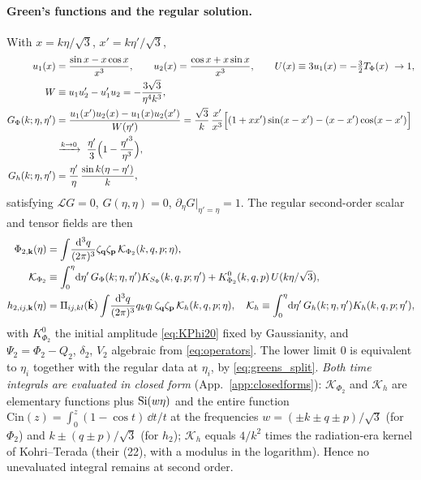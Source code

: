 \paragraph{Green's functions and the regular solution.}
With $x=k\eta/\sqrt3$, $x'=k\eta'/\sqrt3$,
\begin{align}
u_1(x)&=\frac{\sin x-x\cos x}{x^3},\qquad u_2(x)=\frac{\cos x+x\sin x}{x^3},\qquad
U(x)\equiv3u_1(x)=-\tfrac32\TP(x)\ \to1,\nonumber\\
W&\equiv u_1u_2'-u_1'u_2=-\frac{3\sqrt3}{\eta^4k^3},\nonumber\\
G_\Phi(k;\eta,\eta')&=\frac{u_1(x')u_2(x)-u_1(x)u_2(x')}{W(\eta')}
=\frac{\sqrt3}{k}\,\frac{x'}{x^3}\Big[(1+xx')\sin(x-x')-(x-x')\cos(x-x')\Big]\nonumber\\
&\xrightarrow{k\to0}\ \frac{\eta'}3\Big(1-\frac{{\eta'}^3}{\eta^3}\Big),\nonumber\\
G_h(k;\eta,\eta')&=\frac{\eta'}{\eta}\,\frac{\sin k(\eta-\eta')}{k},
\label{eq:greens}
\end{align}
satisfying $\mathcal L G=0$, $G(\eta,\eta)=0$, $\partial_\eta G|_{\eta'=\eta}=1$.  The regular second-order
scalar and tensor fields are then
\begin{align}
\Phi_{2,\mathbf k}(\eta)&=\int\!\frac{\mathrm d^3q}{(2\pi)^3}\zeta_{\mathbf q}\zeta_{\mathbf p}\,\mathcal K_{\Phi_2}(k,q,p;\eta),\nonumber\\
\mathcal K_{\Phi_2}&\equiv\int_{0}^{\eta}\!\mathrm d\eta'\,G_\Phi(k;\eta,\eta')K_{S_\Phi}(k,q,p;\eta')+K^0_{\Phi_2}(k,q,p)\,U(k\eta/\sqrt3),\nonumber\\
h_{2,ij,\mathbf k}(\eta)&=\Pi_{ij,kl}(\hat{\mathbf k})\int\!\frac{\mathrm d^3q}{(2\pi)^3}q_kq_l\,\zeta_{\mathbf q}\zeta_{\mathbf p}\,\mathcal K_h(k,q,p;\eta),\quad
\mathcal K_h\equiv\int_0^\eta\!\mathrm d\eta'\,G_h(k;\eta,\eta')K_h(k,q,p;\eta'),
\label{eq:declared2}
\end{align}
with $K^0_{\Phi_2}$ the initial amplitude \eqref{eq:KPhi20} fixed by Gaussianity, and
$\Psi_2=\Phi_2-Q_2$, $\delta_2$, $V_2$ algebraic from \eqref{eq:operators}.  The lower limit $0$ is equivalent to $\eta_i$
together with the regular data at $\eta_i$, by \eqref{eq:greens_split}.
\emph{Both time integrals are evaluated in closed form} (App.~\ref{app:closedforms}): $\mathcal K_{\Phi_2}$ and $\mathcal K_h$ are
elementary functions plus $\operatorname{Si}(w\eta)$ and the entire function $\mathrm{Cin}(z)=\int_0^z(1-\cos t)\,\dd t/t$ at the frequencies
$w=(\pm k\pm q\pm p)/\sqrt3$ (for $\Phi_2$) and $k\pm(q\pm p)/\sqrt3$ (for $h_2$); $\mathcal K_h$ equals $4/k^2$ times the radiation-era
kernel of Kohri--Terada \cite{KT} (their (22), with a modulus in the logarithm).  Hence no unevaluated integral remains at second
order.

